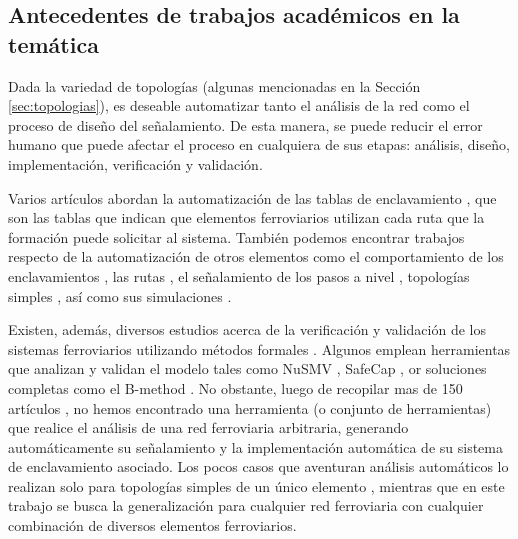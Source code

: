 \subsection{Antecedentes de trabajos académicos en la temática}
\label{sec:estudios}
    Dada la variedad de topologías (algunas mencionadas en la Sección \ref{sec:topologias}), es deseable automatizar tanto el análisis de la red como el proceso de diseño del señalamiento. De esta manera, se puede reducir el error humano que puede afectar el proceso en cualquiera de sus etapas: análisis, diseño, implementación, verificación y validación.

    Varios artículos abordan la automatización de las tablas de enclavamiento \cite{Paper_2,Paper_162,Paper_170,Paper_182}, que son las tablas que indican que elementos ferroviarios utilizan cada ruta que la formación puede solicitar al sistema. También podemos encontrar trabajos respecto de la automatización de otros elementos como el comportamiento de los enclavamientos \cite{Paper_21,Paper_99,Paper_198,Paper_158,Paper_197}, las rutas \cite{Paper_114}, el señalamiento de los pasos a nivel \cite{Paper_86}, topologías simples \cite{Paper_143,Paper_161}, así como sus simulaciones \cite{Paper_100,Paper_181}.

    Existen, además, diversos estudios acerca de la verificación y validación de los sistemas ferroviarios utilizando métodos formales \cite{Paper_184,Paper_144,Paper_87,Paper_186,Paper_187,Paper_188,Paper_89,Paper_141,Paper_161,Paper_164,Paper_165,Paper_171,Paper_189}. Algunos emplean herramientas que analizan y validan el modelo tales como NuSMV \cite{Paper_115,Paper_155,Paper_161,Paper_185}, SafeCap \cite{Paper_189,Paper_194,Paper_195}, or soluciones completas como el B-method \cite{Paper_190,Paper_191,Paper_192,Paper_193}. No obstante, luego de recopilar mas de 150 artículos \cite{BIBLIO}, no hemos encontrado una herramienta (o conjunto de herramientas) que realice el análisis de una red ferroviaria arbitraria, generando automáticamente su señalamiento y la implementación automática de su sistema de enclavamiento asociado. Los pocos casos que aventuran análisis automáticos lo realizan solo para topologías simples de un único elemento \cite{Paper_157,Paper_183}, mientras que en este trabajo se busca la generalización para cualquier red ferroviaria con cualquier combinación de diversos elementos ferroviarios.